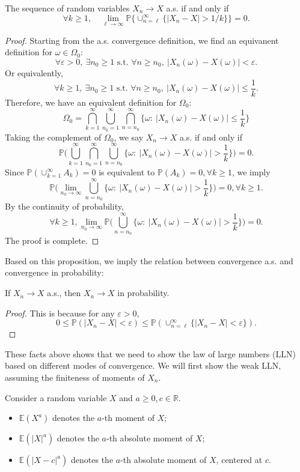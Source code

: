 \begin{proposition}
The sequence of random variables $X_n\to X$ a.s. if and only if 
\[
\forall k\ge1,\quad
\lim_{\ell\to\infty}\mathbb{P}\bigg\{
\cup_{n=\ell}^\infty\{|X_n-X|>1/k\}
\bigg\}=0.
\]
\end{proposition}
\begin{proof}
Starting from the a.s. convergence definition, we find an equivanent definition for $\omega\in\Omega_0$:
\[
\forall \varepsilon>0,~\exists n_0\ge1\text{ s.t. }\forall n\ge n_0,~|X_n(\omega) - X(\omega)|<\varepsilon.
\]
Or equivalently,
\[
\forall k\ge1,~\exists n_0\ge1\text{ s.t. }\forall n\ge n_0,~|X_n(\omega) - X(\omega)|\le\frac{1}{k}.
\]
Therefore, we have an equivalent definition for $\Omega_0$:
\[
\Omega_0 = 
\bigcap_{k=1}^\infty
\bigcup_{n_0=1}^\infty
\bigcap_{n=n_0}^\infty
\bigg\{
\omega:~|X_n(\omega) - X(\omega)|\le\frac{1}{k}
\bigg\}
\]
Taking the complement of $\Omega_0$, we say $X_n\to X$ a.s. if and only if
\[
\mathbb{P}\bigg(
\bigcup_{k=1}^\infty
\bigcap_{n_0=1}^\infty
\bigcup_{n=n_0}^\infty
\bigg\{
\omega:~|X_n(\omega) - X(\omega)|>\frac{1}{k}
\bigg\}
\bigg)=0.
\]
Since $\mathbb{P}(\cup_{k=1}^\infty A_k)=0$ is equivalent to $\mathbb{P}(A_k)=0,\forall k\ge1$, we imply 
\[
\mathbb{P}\bigg(
\lim_{n_0\to\infty}
\bigcup_{n=n_0}^\infty
\bigg\{
\omega:~|X_n(\omega) - X(\omega)|>\frac{1}{k}
\bigg\}
\bigg)=0,\forall k\ge1.
\]
By the continuity of probability, 
\[
\forall k\ge1, \lim_{n_0\to\infty}\mathbb{P}\bigg(
\bigcup_{n=n_0}^\infty
\bigg\{
\omega:~|X_n(\omega) - X(\omega)|>\frac{1}{k}
\bigg\}
\bigg)=0.
\]
The proof is complete.
\end{proof}
Based on this proposition, we imply the relation between convergence a.s. and convergence in probability:
\begin{corollary}
If $X_n\to X$ a.s., then $X_n\to X$ in probability.
\end{corollary}
\begin{proof}
This is because for any $\varepsilon>0$,
\[0\le
\mathbb{P}(|X_n-X|<\varepsilon)\le 
\mathbb{P}(\cup_{n=\ell}^\infty \{|X_n-X|<\varepsilon\}).
\]
\end{proof}

These facts above shows that we need to show the law of large numbers (LLN) based on different modes of convergence.
We will first show the weak LLN, assuming the finiteness of moments of $X_n$.

\begin{definition}
Consider a random variable $X$ and $a\ge0, c\in\mathbb{R}$.
\begin{itemize}
\item
$\mathbb{E}(X^a)$ denotes the $a$-th moment of $X$;
\item
$\mathbb{E}(|X|^a)$ denotes the $a$-th absolute moment of $X$;
\item
$\mathbb{E}(|X-c|^a)$ denotes the $a$-th absolute moment of $X$, centered at $c$.
\end{itemize}
\end{definition}

